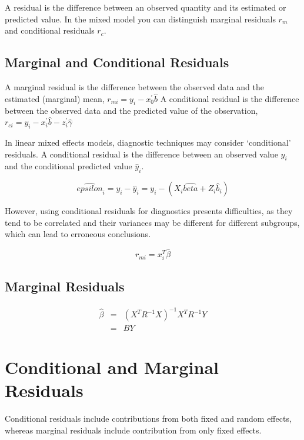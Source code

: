 \documentclass[main.tex]{subfiles}
\begin{document}
	A residual is the difference between an observed quantity and its estimated or predicted value. In the mixed
	model you can distinguish marginal residuals $r_m$ and conditional residuals $r_c$. 
	
	
	\subsection{Marginal and Conditional Residuals}
	
	A marginal residual is the difference between the observed data and the estimated (marginal) mean, $r_{mi} = y_i - x_0^{\prime} \hat{b}$
	A conditional residual is the difference between the observed data and the predicted value of the observation,
	$r_{ci} = y_i - x_i^{\prime} \hat{b} - z_i^{\prime} \hat{\gamma}$
	
	In linear mixed effects models, diagnostic techniques may consider `conditional' residuals. A conditional residual is the difference between an observed value $y_{i}$ and the conditional predicted value $\hat{y}_{i} $.
	
	\[ \hat{epsilon}_{i} = y_{i} - \hat{y}_{i} = y_{i} - ( X_{i}\hat{beta} + Z_{i}\hat{b}_{i}) \]
	
	However, using conditional residuals for diagnostics presents difficulties, as they tend to be correlated and their variances may be different for different subgroups, which can lead to erroneous conclusions.
	
	
	
	
	
	
	
	\begin{equation}
	r_{mi}=x^{T}_{i}\hat{\beta}
	\end{equation}
	
	\subsection{Marginal Residuals}
	\begin{eqnarray}
	\hat{\beta} &=& (X^{T}R^{-1}X)^{-1}X^{T}R^{-1}Y \nonumber \\
	&=& BY \nonumber
	\end{eqnarray}
	
	
\section{Conditional and Marginal Residuals}
Conditional residuals include contributions from both fixed and random effects, whereas marginal residuals include contribution from only fixed effects.
\end{document}

